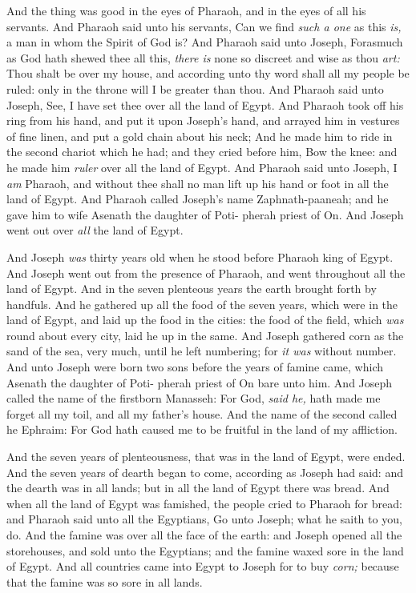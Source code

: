 \documentclass[11pt,letterpaper,oneside]{memoir}
\begin{document}
And the thing was good in the eyes of Pharaoh, and in the eyes of all
his servants. And Pharaoh said unto his servants, Can we find \emph{such
a one} as this \emph{is,} a man in whom the Spirit of God is? And
Pharaoh said unto Joseph, Forasmuch as God hath shewed thee all this,
\emph{there is} none so discreet and wise as thou \emph{art: }Thou shalt be
over my house, and according unto thy word shall all my people be ruled:
only in the throne will I be greater than thou. And Pharaoh said unto
Joseph, See, I have set thee over all the land of Egypt. And Pharaoh
took off his ring from his hand, and put it upon Joseph's hand, and
arrayed him in vestures of fine linen, and put a gold chain about his
neck; And he made him to ride in the second chariot which he had; and
they cried before him, Bow the knee: and he made him \emph{ruler} over
all the land of Egypt. And Pharaoh said unto Joseph, I \emph{am}
Pharaoh, and without thee shall no man lift up his hand or foot in all
the land of Egypt. And Pharaoh called Joseph's name Zaphnath-paaneah;
and he gave him to wife Asenath the daughter of Poti- pherah priest of
On. And Joseph went out over \emph{all} the land of Egypt.

And Joseph \emph{was} thirty years old when he stood before Pharaoh king
of Egypt. And Joseph went out from the presence of Pharaoh, and went
throughout all the land of Egypt. And in the seven plenteous years the
earth brought forth by handfuls. And he gathered up all the food of the
seven years, which were in the land of Egypt, and laid up the food in
the cities: the food of the field, which \emph{was} round about every
city, laid he up in the same. And Joseph gathered corn as the sand of
the sea, very much, until he left numbering; for \emph{it was} without
number. And unto Joseph were born two sons before the years of famine
came, which Asenath the daughter of Poti- pherah priest of On bare unto
him. And Joseph called the name of the firstborn Manasseh: For God,
\emph{said he,} hath made me forget all my toil, and all my father's
house. And the name of the second called he Ephraim: For God hath caused
me to be fruitful in the land of my affliction.

And the seven years of plenteousness, that was in the land of Egypt,
were ended. And the seven years of dearth began to come, according as
Joseph had said: and the dearth was in all lands; but in all the land of
Egypt there was bread. And when all the land of Egypt was famished, the
people cried to Pharaoh for bread: and Pharaoh said unto all the
Egyptians, Go unto Joseph; what he saith to you, do. And the famine was
over all the face of the earth: and Joseph opened all the storehouses,
and sold unto the Egyptians; and the famine waxed sore in the land of
Egypt. And all countries came into Egypt to Joseph for to buy
\emph{corn;} because that the famine was so sore in all lands.
\end{document}
